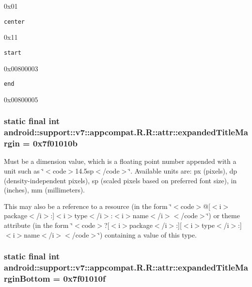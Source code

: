 0x01

{\tt center}

0x11

{\tt start}

0x00800003

{\tt end}

0x00800005\hypertarget{classandroid_1_1support_1_1v7_1_1appcompat_1_1_r_1_1attr_7b18f676eb52d86fcf470e656fe7d678}{
\subsubsection[{expandedTitleMargin}]{\setlength{\rightskip}{0pt plus 5cm}static final int android::support::v7::appcompat.R.R::attr::expandedTitleMargin = 0x7f01010b}}
\label{classandroid_1_1support_1_1v7_1_1appcompat_1_1_r_1_1attr_7b18f676eb52d86fcf470e656fe7d678}


Must be a dimension value, which is a floating point number appended with a unit such as \char`\"{}$<$code$>$14.5sp$<$/code$>$\char`\"{}. Available units are: px (pixels), dp (density-independent pixels), sp (scaled pixels based on preferred font size), in (inches), mm (millimeters). 

This may also be a reference to a resource (in the form \char`\"{}$<$code$>$@\mbox{[}$<$i$>$package$<$/i$>$:\mbox{]}$<$i$>$type$<$/i$>$:$<$i$>$name$<$/i$>$$<$/code$>$\char`\"{}) or theme attribute (in the form \char`\"{}$<$code$>$?\mbox{[}$<$i$>$package$<$/i$>$:\mbox{]}\mbox{[}$<$i$>$type$<$/i$>$:\mbox{]}$<$i$>$name$<$/i$>$$<$/code$>$\char`\"{}) containing a value of this type. \hypertarget{classandroid_1_1support_1_1v7_1_1appcompat_1_1_r_1_1attr_c5b5760b7a9f8cdd1bbc860726218448}{
\subsubsection[{expandedTitleMarginBottom}]{\setlength{\rightskip}{0pt plus 5cm}static final int android::support::v7::appcompat.R.R::attr::expandedTitleMarginBottom = 0x7f01010f}}
\label{classandroid_1_1support_1_1v7_1_1appcompat_1_1_r_1_1attr_c5b5760b7a9f8cdd1bbc860726218448}


